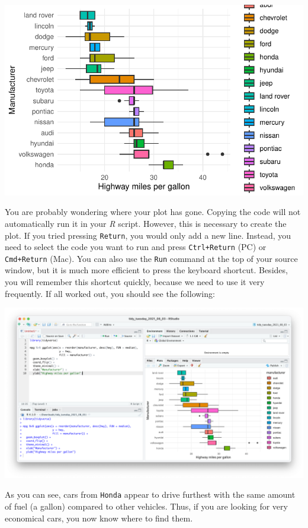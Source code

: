 \documentclass[
  letterpaper,
]{krantz}
\begin{document}
\includegraphics{06_starting_r_projects_files/figure-latex/r-script-copy-paste-examples-1.pdf}

You are probably wondering where your plot has gone. Copying the code
will not automatically run it in your \emph{R} script. However, this is
necessary to create the plot. If you tried pressing \texttt{Return}, you
would only add a new line. Instead, you need to select the code you want
to run and press \texttt{Ctrl+Return} (PC) or \texttt{Cmd+Return} (Mac).
You can also use the \texttt{Run} command at the top of your source
window, but it is much more efficient to press the keyboard shortcut.
Besides, you will remember this shortcut quickly, because we need to use
it very frequently. If all worked out, you should see the following:

\includegraphics{images/chapter_06_img/02_r_script/01_r_script_example_plot.png}

As you can see, cars from \texttt{Honda} appear to drive furthest with
the same amount of fuel (a gallon) compared to other vehicles. Thus, if
you are looking for very economical cars, you now know where to find
them.
\end{document}
